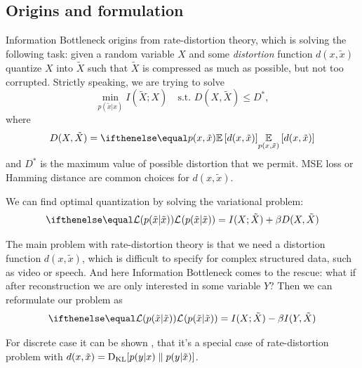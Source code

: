 \documentclass{article}
\begin{document}
\subsection{Origins and formulation}
Information Bottleneck origins from rate-distortion theory, which is solving the following task: given a random variable $X$ and some \textit{distortion} function $d(x,\tilde{x})$ quantize $X$ into $\tilde{X}$ such that $\tilde{X}$ is compressed as much as possible, but not too corrupted.
Strictly speaking, we are trying to solve
\[
\min_{p(\tilde{x} | x)} I(\tilde{X}; X) \quad \text{s.t. } D(X, \tilde{X}) \leq D^*,
\]
where
\[
D(X, \tilde{X}) = \expect[p(x, \tilde{x})]{d(x, \tilde{x})}
\]
and $D^*$ is the maximum value of possible distortion that we permit.
MSE loss or Hamming distance are common choices for $d(x, \tilde{x})$.


%


We can find optimal quantization by solving the variational problem:
\[
\loss{p(\tilde{x} | \tilde{x})} = I(X; \tilde{X}) + \beta D(X, \tilde{X})
\]

The main problem with rate-distortion theory is that we need a distortion function $d(x, \tilde{x})$, which is difficult to specify for complex structured data, such as video or speech.
And here Information Bottleneck comes to the rescue: what if after reconstruction we are only interested in some variable $Y$?
Then we can reformulate our problem as
\[
\loss{p(\tilde{x} | \tilde{x})} = I(X; \tilde{X}) - \beta I(Y, \tilde{X})
\]

For discrete case it can be shown \cite{Information_Bottleneck}, that it's a special case of rate-distortion problem with $d(x, \tilde{x}) = \text{D}_\text{KL}[p(y|x) \parallel p(y|\tilde{x})]$.
\end{document}
